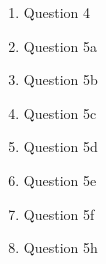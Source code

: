 \documentclass[11pt]{article}
\begin{document}
\begin{enumerate}
\item Question 4

\item Question 5a

\item Question 5b

\item Question 5c

\item Question 5d

\item Question 5e

\item Question 5f

\item Question 5h

\end{enumerate}
\end{document}
